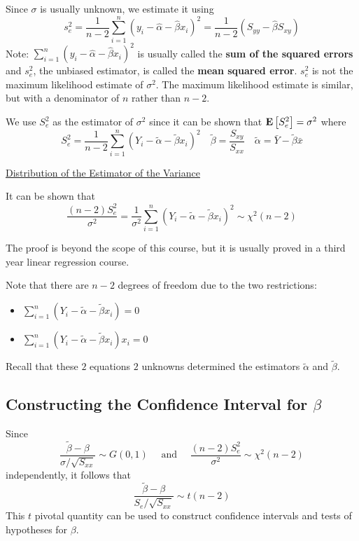 Since $ \sigma $ is usually unknown, we estimate it using
\[s_{e}^{2}=\frac{1}{n-2} \sum_{i=1}^{n}\left(y_{i}-\hat{\alpha}-\hat{\beta} x_{i}\right)^{2}
    =\frac{1}{n-2}\left(S_{y y}-\hat{\beta} S_{x y}\right)\]
Note: $\sum\limits_{i=1}^{n}\left(y_{i}-\hat{\alpha}-\hat{\beta} x_{i}\right)^{2}$ is usually called the
\textbf{sum of the squared errors} and $ s_e^2 $, the unbiased estimator,
is called the \textbf{mean squared error}. $ s_e^2 $ is not the maximum likelihood estimate of
$ \sigma^2 $. The maximum likelihood estimate is similar, but with a denominator of $ n $
rather than $ n-2 $.

We use $ S_e^2 $ as the estimator of $ \sigma^2 $ since it can be shown that
$ \bm{\mathrm{E}}\left[S_e^2\right]=\sigma^2 $ where
\[ S_{e}^{2}=\frac{1}{n-2} \sum_{i=1}^{n}\left(Y_{i}-\tilde{\alpha}-\tilde{\beta} x_{i}\right)^{2}
    \quad \tilde{\beta}=\frac{S_{x y}}{S_{x x}}
    \quad \tilde{\alpha}=\bar{Y}-\tilde{\beta} \bar{x} \]

\underline{Distribution of the Estimator of the Variance}

It can be shown that
\[ \frac{(n-2) S_{e}^{2}}{\sigma^{2}}
    =\frac{1}{\sigma^{2}} \sum_{i=1}^{n}\left(Y_{i}-\tilde{\alpha}-\tilde{\beta} x_{i}\right)^{2}
    \sim \chi^{2}(n-2) \]

The proof is beyond the scope of this course, but it is usually proved in a third year linear
regression course.

Note that there are $ n-2 $ degrees of freedom due to the two restrictions:
\begin{itemize}
    \item $\sum\limits_{i=1}^{n}\left(Y_{i}-\tilde{\alpha}-\tilde{\beta} x_{i}\right)=0$
    \item $\sum\limits_{i=1}^{n}\left(Y_{i}-\tilde{\alpha}-\tilde{\beta} x_{i}\right) x_{i}=0$
\end{itemize}
Recall that these $ 2 $ equations $ 2 $ unknowns determined the estimators
$ \tilde{\alpha} $ and $ \tilde{\beta} $.

\subsection{Constructing the Confidence Interval for $ \beta $}
Since
\[\frac{\tilde{\beta}-\beta}{\sigma / \sqrt{S_{x x}}} \sim G(0,1) \quad \text { and }
    \quad \frac{(n-2) S_{e}^{2}}{\sigma^{2}} \sim \chi^{2}(n-2)\]
independently, it follows that
\[ \frac{\tilde{\beta}-\beta}{S_e / \sqrt{S_{x x}}} \sim t(n-2)\]
This $ t $ pivotal quantity can be used to construct confidence intervals
and tests of hypotheses for $ \beta $.

